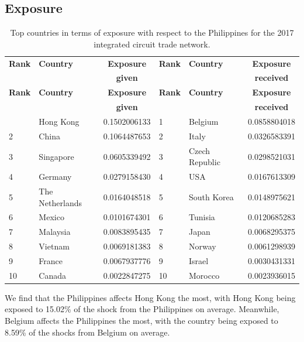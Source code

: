 \documentclass[12pt,letterpaper]{report}
\begin{document}
		\subsection{Exposure}
		\label{ssec:532exposure}
		
		\begin{longtable}{|l|l|r|l|l|r|}
			\caption{Top countries in terms of exposure with respect to the Philippines for the 2017 integrated circuit trade network. \label{tab:tab07Exposure1}} \\
			\hline
			\textbf{\small Rank} & \textbf{\small Country} & \multicolumn{1}{|c|}{\textbf{\small Exposure}} & \textbf{\small Rank} &
			\textbf{\small Country} & \multicolumn{1}{|c|}{\textbf{\small Exposure}} \\
			&  & \multicolumn{1}{|c|}{\textbf{\small given}} & & & \multicolumn{1}{|c|}{\textbf{\small received}} \\  
			\hline
			\endfirsthead
			\hline
			\textbf{\small Rank} & \textbf{\small Country} & \multicolumn{1}{|c|}{\textbf{\small Exposure}} & \textbf{\small Rank} &
			\textbf{\small Country} & \multicolumn{1}{|c|}{\textbf{\small Exposure}} \\
			&  & \multicolumn{1}{|c|}{\textbf{\small given}} & & & \multicolumn{1}{|c|}{\textbf{\small received}} \\  
			\hline
			\endhead
			\hline
			\endfoot
			1 & Hong Kong & 0.1502006133 & 1 & Belgium & 0.0858804018 \\
			2 & China & 0.1064487653 & 2 & Italy & 0.0326583391 \\
			3 & Singapore & 0.0605339492 & 3 & Czech Republic & 0.0298521031 \\
			4 & Germany & 0.0279158430 & 4 & USA & 0.0167613309 \\
			5 & The Netherlands & 0.0164048518 & 5 & South Korea & 0.0148975621 \\
			6 & Mexico & 0.0101674301 & 6 & Tunisia & 0.0120685283 \\
			7 & Malaysia & 0.0083895435 & 7 & Japan & 0.0068295375 \\
			8 & Vietnam & 0.0069181383 & 8 & Norway & 0.0061298939 \\
			9 & France & 0.0067937776 & 9 & Israel & 0.0030431331 \\
			10 & Canada & 0.0022847275 & 10 & Morocco & 0.0023936015 \\
		\end{longtable}
		
		We find that the Philippines affects Hong Kong the most, with Hong Kong being exposed to 15.02\% of the shock from the Philippines on average. Meanwhile, Belgium affects the Philippines the most, with the country being exposed to 8.59\% of the shocks from Belgium on average.
		
\end{document}
